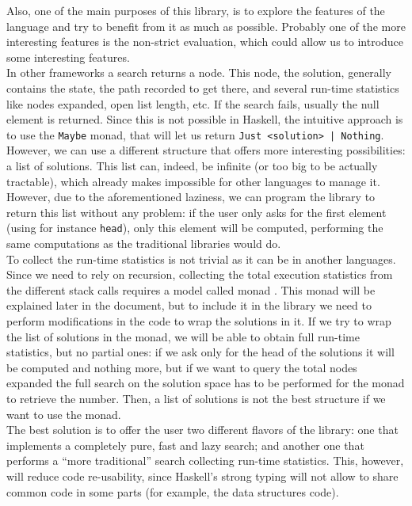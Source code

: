 Also, one of the main purposes of this library, is to explore the features of
the language and try to benefit from it as much as possible. Probably one of
the more interesting features is the non-strict evaluation, which could allow
us to introduce some interesting features.\\

In other frameworks \cite{cpp-search, cs4j, java-aima, hog2} a search returns a
node. This node, the solution, generally contains the state, the path recorded
to get there, and several run-time statistics like nodes expanded, open list
length, etc. If the search fails, usually the null element is returned. Since
this is not possible in Haskell, the intuitive approach is to use the
\texttt{Maybe} monad, that will let us return \texttt{Just <solution> |
  Nothing}. However, we can use a different structure that offers more
interesting possibilities: a list of solutions. This list can, indeed, be
infinite (or too big to be actually tractable), which already makes impossible
for other languages to manage it. However, due to the aforementioned laziness,
we can program the library to return this list without any problem: if the user
only asks for the first element (using for instance \texttt{head}), only this
element will be computed, performing the same computations as the traditional
libraries would do.\\

To collect the run-time statistics is not trivial as it can be in another
languages. Since we need to rely on recursion, collecting the total execution
statistics from the different stack calls requires a model called monad
\cite{wadler-1993-monad}. This monad will be explained later in the document,
but to include it in the library we need to perform modifications in the code
to wrap the solutions in it. If we try to wrap the list of solutions in the
monad, we will be able to obtain full run-time statistics, but no partial ones:
if we ask only for the head of the solutions it will be computed and nothing
more, but if we want to query the total nodes expanded the full search on the
solution space has to be performed for the monad to retrieve the number. Then,
a list of solutions is not the best structure if we want to use the monad.\\

The best solution is to offer the user two different flavors of the library:
one that implements a completely pure, fast and lazy search; and another one
that performs a ``more traditional'' search collecting run-time statistics.
This, however, will reduce code re-usability, since Haskell's strong typing
will not allow to share common code in some parts (for example, the data
structures code).\\

